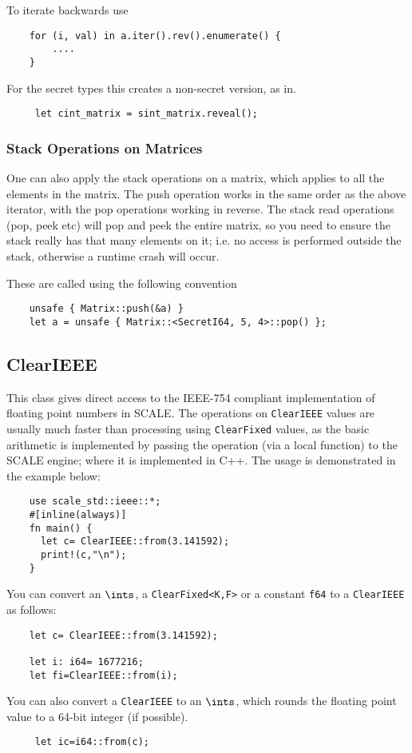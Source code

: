 \noindent
To iterate backwards use
\begin{lstlisting}
    for (i, val) in a.iter().rev().enumerate() {
        ....
    }
\end{lstlisting}

For the secret types this creates a non-secret version, as in.
\begin{lstlisting}
     let cint_matrix = sint_matrix.reveal();
\end{lstlisting}

\subsubsection{Stack Operations on Matrices}
One can also apply the stack operations on a matrix, which
applies to all the elements in the matrix.
The push operation works in the same order as the above
iterator, with the pop operations working in reverse.
The stack read operations (pop, peek etc) will pop and peek
the entire matrix, so you need to ensure the stack really has
that many elements on it; i.e. no access is performed outside
the stack, otherwise a runtime crash will occur.

These are called using the following convention
\begin{lstlisting}
    unsafe { Matrix::push(&a) }
    let a = unsafe { Matrix::<SecretI64, 5, 4>::pop() };
\end{lstlisting}

\subsection{ClearIEEE}
This class gives direct access to the IEEE-754 compliant implementation
of floating point numbers in SCALE.
The operations on \verb|ClearIEEE| values are usually much
faster than processing using \verb|ClearFixed| values, as
the basic arithmetic is implemented by passing the operation
(via a local function) to the SCALE engine; where it is implemented
in C++.
The usage is demonstrated in the example below:
\begin{lstlisting}
    use scale_std::ieee::*;
    #[inline(always)]
    fn main() {
      let c= ClearIEEE::from(3.141592);
      print!(c,"\n");
    }
\end{lstlisting}

You can convert an $\ints$, a \verb|ClearFixed<K,F>| 
or a constant \verb|f64| to a \verb|ClearIEEE| as follows:
\begin{lstlisting}
    let c= ClearIEEE::from(3.141592);

    let i: i64= 1677216;
    let fi=ClearIEEE::from(i);
\end{lstlisting}
You can also convert a  \verb|ClearIEEE| to an $\ints$, which rounds the
floating point value to a 64-bit integer (if possible).
\begin{lstlisting}
     let ic=i64::from(c);
\end{lstlisting}

